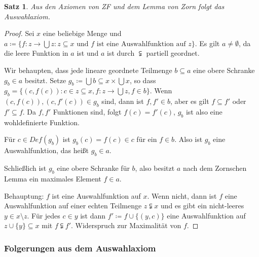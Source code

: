 \documentclass[german]{article}
\theoremstyle{break}
\theoremstyle{def_style}
\theoremstyle{def_style}
\newtheorem{satz}{Satz}[section]
\theoremstyle{lemma_style}
\begin{document}
\begin{satz}
	Aus den Axiomen von ZF und dem Lemma von Zorn folgt das Auswahlaxiom.
\end{satz}
\begin{proof}
	Sei $x$ eine beliebige Menge und $a\coloneqq\{f:z\to\bigcup z : z\subseteq x \text{ und } f \text{ ist eine Auswahlfunktion auf } z\}$.
	Es gilt $a\neq\emptyset$, da die leere Funktion in $a$ ist und $a$ ist durch $\subsetneqq$ partiell geordnet.
	
	Wir behaupten, dass jede lineare geordnete Teilmenge $b\subseteq a$ eine obere Schranke $g_b\in a$ besitzt. Setze $g_b\coloneqq \bigcup b\subseteq x\times \bigcup x$, so dass $g_b=\{(c, f(c)) : c\in z\subseteq x, f:z\to\bigcup z, f\in b\}$. Wenn $(c,f(c)),(c,f'(c))\in g_b$ sind, dann ist $f, f'\in b$, aber es gilt $f\subseteq f'$ oder $f'\subseteq f$. Da $f,f'$ Funktionen sind, folgt $f(c)=f'(c)$, $g_b$ ist also eine wohldefinierte Funktion.
	
	Für $c\in Def(g_b)$ ist $g_b(c)=f(c)\in c$ für ein $f\in b$. Also ist $g_b$ eine Auswahlfunktion, das heißt $g_b\in a$.
	
	Schließlich ist $g_b$ eine obere Schranke für $b$, also besitzt $a$ nach dem Zornschen Lemma ein maximales Element $f\in a$.
	
	Behauptung: $f$ ist eine Auswahlfunktion auf $x$. Wenn nicht, dann ist $f$ eine Auswahlfunktion auf einer echten Teilmenge $z\subsetneqq x$ und es gibt ein nicht-leeres $y\in x\setminus z$. Für jedes $c\in y$ ist dann $f'\coloneqq f\cup\{(y,c)\}$ eine Auswahlfunktion auf $z\cup\{y\}\subseteq x$ mit $f\subsetneqq f'$. Widerspruch zur Maximalität von $f$.
\end{proof}

\subsubsection{Folgerungen aus dem Auswahlaxiom}
\end{document}
